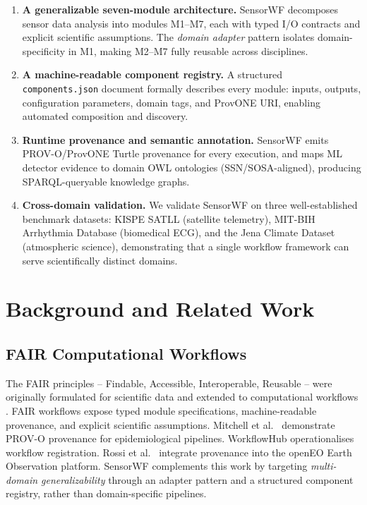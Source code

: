 \documentclass[conference]{IEEEtran}
\begin{document}
\begin{enumerate}
  \item \textbf{A generalizable seven-module architecture.} SensorWF decomposes
    sensor data analysis into modules M1--M7, each with typed I/O contracts and
    explicit scientific assumptions. The \emph{domain adapter} pattern isolates
    domain-specificity in M1, making M2--M7 fully reusable across disciplines.
  \item \textbf{A machine-readable component registry.} A structured
    \texttt{components.json} document formally describes every module: inputs,
    outputs, configuration parameters, domain tags, and ProvONE URI, enabling
    automated composition and discovery.
  \item \textbf{Runtime provenance and semantic annotation.} SensorWF emits
    PROV-O/ProvONE Turtle provenance for every execution, and maps ML detector
    evidence to domain OWL ontologies (SSN/SOSA-aligned), producing
    SPARQL-queryable knowledge graphs.
  \item \textbf{Cross-domain validation.} We validate SensorWF on three
    well-established benchmark datasets: KISPE SATLL (satellite telemetry),
    MIT-BIH Arrhythmia Database (biomedical ECG), and the Jena Climate Dataset
    (atmospheric science), demonstrating that a single workflow framework can
    serve scientifically distinct domains.
\end{enumerate}

\section{Background and Related Work}
\label{sec:background}

\subsection{FAIR Computational Workflows}

The FAIR principles -- Findable, Accessible, Interoperable, Reusable -- were
originally formulated for scientific data \cite{wilkinson2016fair} and extended
to computational workflows \cite{garijo2022fair}. FAIR workflows expose typed
module specifications, machine-readable provenance, and explicit scientific
assumptions. Mitchell et al.\ \cite{mitchell2022fair} demonstrate PROV-O
provenance for epidemiological pipelines. WorkflowHub \cite{wilkinson2025workflowhub}
operationalises workflow registration. Rossi et al.\ \cite{rossi2025openeo}
integrate provenance into the openEO Earth Observation platform. SensorWF
complements this work by targeting \emph{multi-domain generalizability} through
an adapter pattern and a structured component registry, rather than
domain-specific pipelines.
\end{document}
